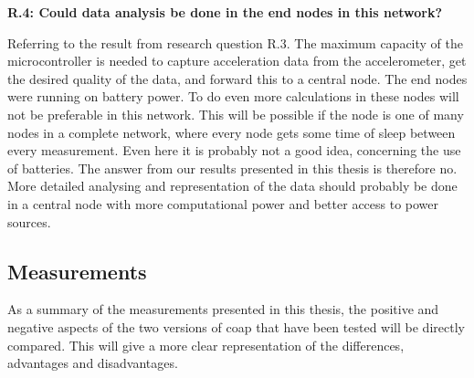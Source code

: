 \noindent\textbf{R.4: Could data analysis be done in the end nodes in this network?}

\noindent Referring to the result from research question R.3. The maximum capacity of the \gls{microcontroller} is needed to capture acceleration data from the accelerometer, get the desired quality of the data, and forward this to a central node. The end nodes were running on battery power. To do even more calculations in these nodes will not be preferable in this network. This will be possible if the node is one of many nodes in a complete network, where every node gets some time of sleep between every measurement. Even here it is probably not a good idea, concerning the use of batteries. The answer from our results presented in this thesis is therefore no. More detailed analysing and representation of the data should probably be done in a central node with more computational power and better access to power sources. 

\newpage
\subsection{Measurements}


\noindent As a summary of the measurements presented in this thesis, the positive and negative aspects of the two versions of \gls{coap} that have been tested will be directly compared. This will give a more clear representation of the differences, advantages and disadvantages.



